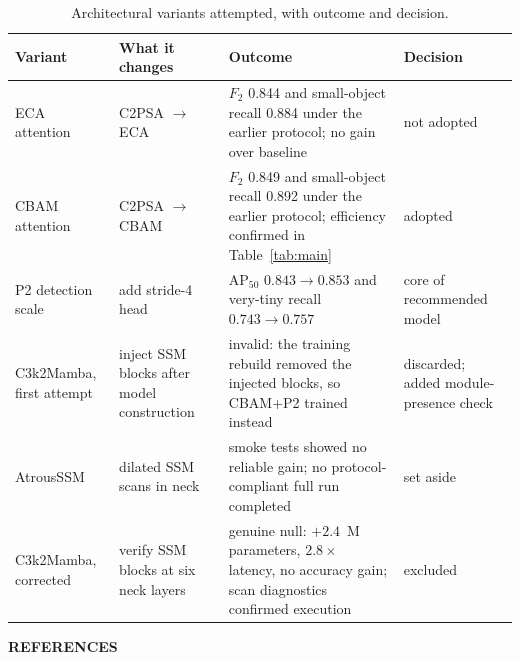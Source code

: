\documentclass[12pt,a4paper,oneside]{report}
\begin{document}
\begin{table}[tbp]
  \centering
  \caption{Architectural variants attempted, with outcome and decision.}
  \label{tab:apphistory}
  \small
  \setlength{\tabcolsep}{3pt}
  \begin{tabular}{|p{2.4cm}|p{3.5cm}|p{5.1cm}|p{2.7cm}|}
    \hline
    Variant & What it changes & Outcome & Decision \\
    \hline
    ECA attention & C2PSA $\to$ ECA & $F_2$ 0.844 and small-object recall 0.884 under the earlier protocol; no gain over baseline & not adopted \\ \hline
    CBAM attention & C2PSA $\to$ CBAM & $F_2$ 0.849 and small-object recall 0.892 under the earlier protocol; efficiency confirmed in Table~\ref{tab:main} & adopted \\ \hline
    P2 detection scale & add stride-4 head & $\mathrm{AP}_{50}$ $0.843 \to 0.853$ and very-tiny recall $0.743 \to 0.757$ & core of recommended model \\ \hline
    C3k2Mamba, first attempt & inject SSM blocks after model construction & invalid: the training rebuild removed the injected blocks, so CBAM+P2 trained instead & discarded; added module-presence check \\ \hline
    AtrousSSM & dilated SSM scans in neck & smoke tests showed no reliable gain; no protocol-compliant full run completed & set aside \\ \hline
    C3k2Mamba, corrected & verify SSM blocks at six neck layers & genuine null: $+2.4$~M parameters, $2.8\times$ latency, no accuracy gain; scan diagnostics confirmed execution & excluded \\
    \hline
  \end{tabular}
\end{table}

\clearpage
{}
{}
\begin{center}{\fontsize{14}{21}\selectfont\bfseries REFERENCES}\end{center}
\printbibliography[heading=none]
\end{document}
